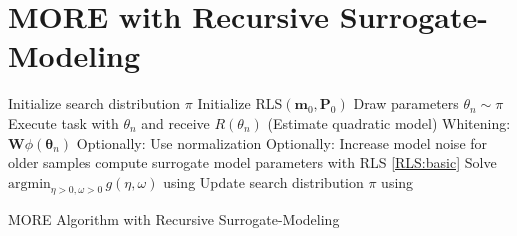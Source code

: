 \section{MORE with Recursive Surrogate-Modeling}
\begin{algorithm}[H]

\DontPrintSemicolon
\SetAlgoLined
{}
{
  Initialize search distribution $\pi$
  Initialize RLS$(\mathbf{m}_0, \mathbf{P}_0)$
}
{
  {
    Draw parameters $\theta_n \sim \pi$\;
    Execute task with $\theta_n$ and receive $R(\theta_n)$\;
  }
  \Begin(Estimate quadratic model)
  {
    {
      Whitening: $\mathbf{W}\phi(\mathbf{\theta}_n)$\;
      Optionally: Use normalization\;
      Optionally: Increase model noise for older samples\;      
      compute surrogate model parameters with RLS  \cref{RLS:basic}\;
    }
  }
  Solve  $\text{argmin}_{\eta >0, \omega > 0} \, g(\eta, \omega)$
  using  \;
  Update search distribution $\pi$ using \;
}
\caption{MORE Algorithm with Recursive Surrogate-Modeling}
\end{algorithm}



%
%
%
%
%
%
